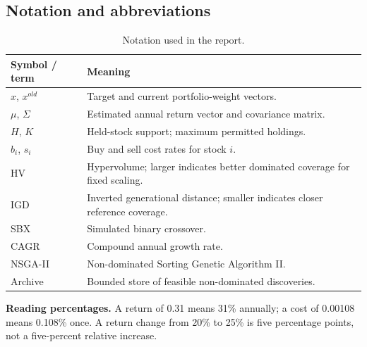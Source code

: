 \documentclass[12pt,a4paper]{article}
\newcommand{\note}[1]{\par\smallskip\noindent\colorbox{light}{\parbox{\dimexpr\linewidth-2\fboxsep}{\small #1}}\par\smallskip}
\begin{document}
\subsection{Notation and abbreviations}
\begin{table}[H]\centering
\begin{tabularx}{\linewidth}{@{}p{34mm}Y@{}}\toprule
Symbol / term & Meaning\\\midrule
$x$, $x^{old}$ & Target and current portfolio-weight vectors.\\
$\mu$, $\Sigma$ & Estimated annual return vector and covariance matrix.\\
$H$, $K$ & Held-stock support; maximum permitted holdings.\\
$b_i$, $s_i$ & Buy and sell cost rates for stock $i$.\\
HV & Hypervolume; larger indicates better dominated coverage for fixed scaling.\\
IGD & Inverted generational distance; smaller indicates closer reference coverage.\\
SBX & Simulated binary crossover.\\
CAGR & Compound annual growth rate.\\
NSGA-II & Non-dominated Sorting Genetic Algorithm II.\\
Archive & Bounded store of feasible non-dominated discoveries.\\\bottomrule
\end{tabularx}
\caption{Notation used in the report.}
\end{table}
\note{\textbf{Reading percentages.} A return of 0.31 means 31\% annually; a cost of 0.00108 means 0.108\% once. A return change from 20\% to 25\% is five percentage points, not a five-percent relative increase.}
\end{document}
